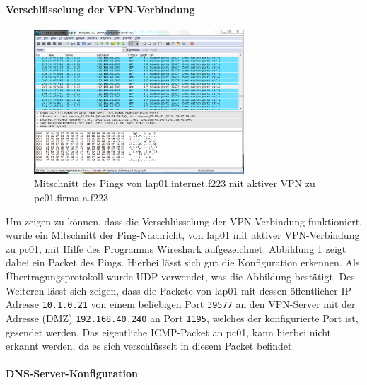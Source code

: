 \paragraph{Verschlüsselung der VPN-Verbindung}

\begin{figure}[h!]
  \centering
    \includegraphics[width=0.7\textwidth]{figures/vpn_ws_lap01_ping_pc01.png}
  \caption{Mitschnitt des Pings von lap01.internet.f223 mit aktiver VPN zu pc01.firma-a.f223}
  \label{vpn:ws_lap01-ping-pc01}
\end{figure}


Um zeigen zu können, dass die Verschlüsselung der VPN-Verbindung funktioniert, wurde ein Mitschnitt der Ping-Nachricht, von lap01 mit aktiver VPN-Verbindung zu pc01, mit Hilfe des Programms Wireshark aufgezeichnet.
Abbildung \ref{vpn:ws_lap01-ping-pc01} zeigt dabei ein Packet des Pings. Hierbei lässt sich gut die Konfiguration erkennen. Als Übertragungsprotokoll wurde UDP verwendet, was die Abbildung bestätigt. Des Weiteren lässt sich zeigen, dass die Packete von lap01 mit dessen öffentlicher IP-Adresse \texttt{10.1.0.21} von einem beliebigen Port \texttt{39577} an den VPN-Server mit der Adresse (DMZ) \texttt{192.168.40.240} an Port \texttt{1195}, welches der konfigurierte Port ist, gesendet werden. Das eigentliche ICMP-Packet an pc01, kann hierbei nicht erkannt werden, da es sich verschlüsselt in diesem Packet befindet.

\paragraph{DNS-Server-Konfiguration}

